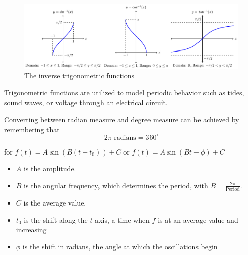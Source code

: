 % 
% 
\begin{figure}[ht!]
    \begin{center}
        \includegraphics[width=1\columnwidth]{figures/0-5-fig12.pdf}
    \end{center}
    \caption{The inverse trigonometric functions}
    \label{F:0.5.inverse_trig}
\end{figure}


\clearpage


\begin{summary}
\item Trigonometric functions are utilized to model periodic behavior such as tides,
    sound waves, or voltage through an electrical circuit.
\item Converting between radian measure and degree measure can be achieved by remembering
    that
    \[ 2\pi \text{ radians} = 360^\circ \]
\item for $f(t) = A \sin( B ( t - t_0) ) + C$ or $f(t) = A \sin( B t + \phi) + C$
\begin{itemize}
\item $A$ is the amplitude.  
\item $B$ is the angular frequency, which determines the period, with $B = \frac{2 \pi}{\mbox{Period}}$.  
\item $C$ is the average value.  
\item $t_0$ is the shift along the $t$ axis, a time when $f$ is at an average value and increasing
\item $\phi$ is the shift in radians, the angle at which the oscillations begin
\end{itemize}
\end{summary}







\clearpage
